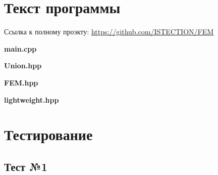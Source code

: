 \documentclass[12pt,a4paper]{article}
\begin{document}
\newpage
\section{Текст программы}

Ссылка к полному проэкту:
\href{https://github.com/ISTECTION/FEM}{https://github.com/ISTECTION/FEM}

\begin{myquote}
    \begin{center}
        \textbf{main.cpp}
    \end{center}
\end{myquote}

\begin{myquote}
    \begin{center}
        \textbf{Union.hpp}
    \end{center}
\end{myquote}

\begin{myquote}
    \begin{center}
        \textbf{FEM.hpp}
    \end{center}
\end{myquote}

\begin{myquote}
    \begin{center}
        \textbf{lightweight.hpp}
    \end{center}
\end{myquote}

\newpage
\section{Тестирование}

\subsection*{Тест №1}
\end{document}
